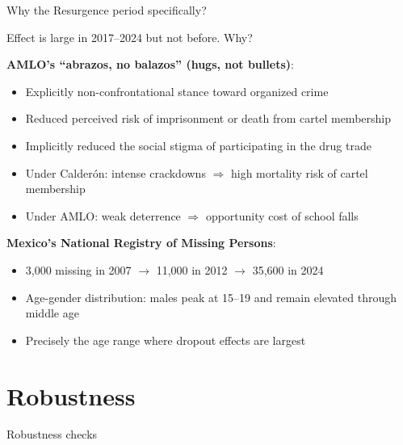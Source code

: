\documentclass[aspectratio=169]{beamer}
\begin{document}
\begin{frame}{Why the Resurgence period specifically?}

Effect is large in 2017--2024 but not before. Why?

\vspace{0.4cm}
\pause

\textbf{AMLO's ``abrazos, no balazos'' (hugs, not bullets)}:
\begin{itemize}
    \item Explicitly non-confrontational stance toward organized crime
    \item Reduced perceived risk of imprisonment or death from cartel membership
    \item Implicitly reduced the social stigma of participating in the drug trade
    \item Under Calder\'on: intense crackdowns $\Rightarrow$ high mortality risk of cartel membership
    \item Under AMLO: weak deterrence $\Rightarrow$ opportunity cost of school falls
\end{itemize}

\vspace{0.4cm}
\pause

\textbf{Mexico's National Registry of Missing Persons}:
\begin{itemize}
    \item 3,000 missing in 2007 $\rightarrow$ 11,000 in 2012 $\rightarrow$ 35,600 in 2024
    \item Age-gender distribution: males peak at 15--19 and remain elevated through middle age
    \item Precisely the age range where dropout effects are largest
\end{itemize}

\end{frame}


\section{Robustness}

\begin{frame}{Robustness checks}

\begin{center}
\scalebox{0.62}{%
\begin{threeparttable}

\end{threeparttable}
}
\end{center}

\end{frame}
\end{document}
